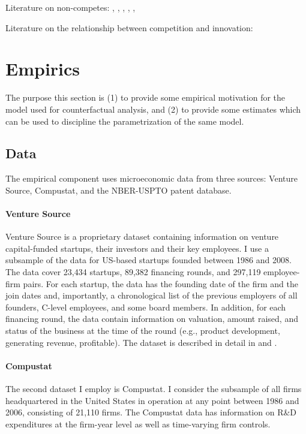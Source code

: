 \documentclass[11pt,english]{article}
\theoremstyle{remark}
\begin{document}
Literature on non-competes: \cite{saxenian_regional_1994}, \cite{gilson_legal_1999}, \cite{jeffers_impact_2018}, \cite{marx_mobility_2009}, \cite{marx_regional_2015}, \cite{starr_noncompetes_2019}

Literature on the relationship between competition and innovation: \cite{aghion_competition_2005}


\section{Empirics}\label{Empirics}

The purpose this section is (1) to provide some empirical motivation for the model used for counterfactual analysis, and (2) to provide some estimates which can be used to discipline the parametrization of the same model. 

\subsection{Data}

The empirical component uses microeconomic data from three sources: Venture Source, Compustat, and the NBER-USPTO patent database.

\paragraph{Venture Source}

Venture Source is a proprietary dataset containing information on venture capital-funded startups, their investors and their key employees. I use a subsample of the data for US-based startups founded between 1986 and 2008. The data cover 23,434 startups, 89,382 financing rounds, and 297,119 employee-firm pairs. For each startup, the data has the founding date of the firm and the join dates and, importantly, a chronological list of the previous employers of all founders, C-level employees, and some board members. In addition, for each financing round, the data contain information on valuation, amount raised, and status of the business at the time of the round (e.g., product development, generating revenue, profitable). The dataset is described in detail in \cite{kaplan_how_2002} and \cite{kaplan_venture_2016}. 

\paragraph{Compustat}

The second dataset I employ is Compustat. I consider the subsample of all firms headquartered in the United States in operation at any point between 1986 and 2006, consisting of 21,110 firms. The Compustat data has information on R\&D expenditures at the firm-year level as well as time-varying firm controls.
\end{document}
